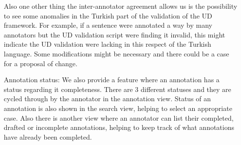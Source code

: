 \begin{itemize}[before=\normalfont, font=\itshape, align=left]

Also one other thing the inter-annotator agreement allows us is the possibility to see some anomalies in the Turkish part of the validation of the UD framework.
For example, if a sentence were annotated a way by many annotators but the UD validation script were finding it invalid, this might indicate the UD validation were lacking in this respect of the Turkish language.
Some modifications might be necessary and there could be a case for a proposal of change.

\item[Annotation status:] We also provide a feature where an annotation has a status regarding it completeness.
There are 3 different statuses and they are cycled through by the annotator in the annotation view.
Status of an annotation is also shown in the search view, helping to select an appropriate case.
Also there is another view where an annotator can list their completed, drafted or incomplete annotations, helping to keep track of what annotations have already been completed.

\end{itemize}
